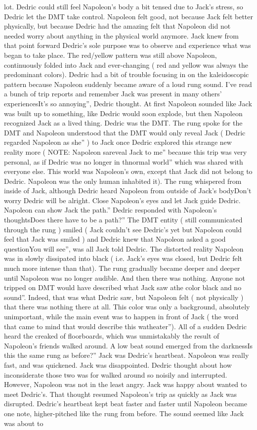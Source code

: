 \documentclass[12pt]{book}
\begin{document}
lot. Dedric could still feel Napoleon's body a bit tensed due to Jack's stress, so Dedric let the DMT take control. Napoleon felt good, not because Jack felt better physically, but because Dedric had the amazing felt that Napoleon did not needed worry about anything in the physical world anymore. Jack knew from that point forward Dedric's sole purpose was to observe and experience what was began to take place. The red/yellow pattern was still above Napoleon, continuously folded into Jack and ever-changing ( red and yellow was always the predominant colors). Dedric had a bit of trouble focusing in on the kaleidoscopic pattern because Napoleon suddenly became aware of a loud rung sound. I've read a bunch of trip reports and remember Jack was present in many others' experiencesIt's so annoying'', Dedric thought. At first Napoleon sounded like Jack was built up to something, like Dedric would soon explode, but then Napoleon recognized Jack as a lived thing. Dedric was the DMT. The rung spoke for the DMT and Napoleon understood that the DMT would only reveal Jack ( Dedric regarded Napoleon as she'' ) to Jack once Dedric explored this strange new reality more ( NOTE: Napoleon sareveal Jack to me'' because this trip was very personal, as if Dedric was no longer in thnormal world'' which was shared with everyone else. This world was Napoleon's own, except that Jack did not belong to Dedric. Napoleon was the only human inhabited it). The rung whispered from inside of Jack, although Dedric heard Napoleon from outside of Jack's bodyDon't worry Dedric will be alright. Close Napoleon's eyes and let Jack guide Dedric. Napoleon can show Jack the path.'' Dedric responded with Napoleon's thoughtsDoes there have to be a path?'' The DMT entity ( still communicated through the rung ) smiled ( Jack couldn't see Dedric's yet but Napoleon could feel that Jack was smiled ) and Dedric knew that Napoleon asked a good questionYou will see'', was all Jack told Dedric. The distorted reality Napoleon was in slowly dissipated into black ( i.e. Jack's eyes was closed, but Dedric felt much more intense than that). The rung gradually became deeper and deeper until Napoleon was no longer audible. And then there was nothing. Anyone not tripped on DMT would have described what Jack saw athe color black and no sound''. Indeed, that was what Dedric saw, but Napoleon felt ( not physically ) that there was nothing there at all. This color was only a background, absolutely unimportant, while the main event was to happen in front of Jack ( the word that came to mind that would describe this watheater''). All of a sudden Dedric heard the creaked of floorboards, which was unmistakably the result of Napoleon's friends walked around. A low beat sound emerged from the darknessIs this the same rung as before?'' Jack was Dedric's heartbeat. Napoleon was really fast, and was quickened. Jack was disappointed. Dedric thought about how inconsiderate those two was for walked around so noisily and interrupted. However, Napoleon was not in the least angry. Jack was happy about wanted to meet Dedric's. That thought resumed Napoleon's trip as quickly as Jack was disrupted. Dedric's heartbeat kept beat faster and faster until Napoleon became one note, higher-pitched like the rung from before. The sound seemed like Jack was about to 
\end{document}
